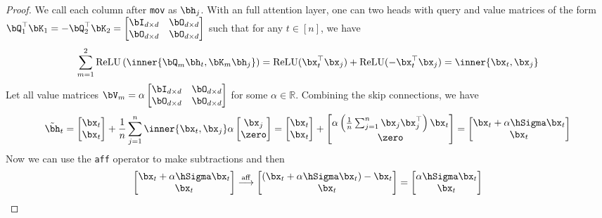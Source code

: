 \begin{proof}
We call each column after \verb|mov| as $\bh_j$. With an full attention layer, one can  two heads with query and value matrices of the form $\bQ_1^\top \bK_1 = -\bQ_2^\top \bK_2 = \begin{bmatrix}
    \bI_{d \times d} & \bO_{d \times d} \\
    \bO_{d \times d} & \bO_{d \times d}
\end{bmatrix}$ such that for any $t \in [n]$, we have 
\begin{equation}
    \sum_{m=1}^2 \mathrm{ReLU} \left(\inner{\bQ_m \bh_t, \bK_m \bh_j}\right) = \mathrm{ReLU}(\bx_t^\top \bx_j) +  \mathrm{ReLU}(-\bx_t^\top \bx_j) = \inner{\bx_t, \bx_j}
\end{equation}
Let all value matrices $\bV_m =\alpha \begin{bmatrix}
    \bI_{d \times d} & \bO_{d \times d} \\
    \bO_{d \times d} & \bO_{d \times d}
\end{bmatrix}$ for some $\alpha \in \mathbb R$. Combining the skip connections, we have 
\begin{equation}
    \tilde{\bh}_t = \begin{bmatrix}
        \bx_t \\ \bx_t
    \end{bmatrix} + \frac{1}{n} \sum_{j=1}^n \inner {\bx_t, \bx_j} \alpha \begin{bmatrix}
        \bx_j \\ \zero 
    \end{bmatrix}  = \begin{bmatrix}
        \bx_t \\ \bx_t
    \end{bmatrix} + \begin{bmatrix}
       \alpha \left(\frac{1}{n} \sum_{j=1}^n \bx_j \bx_j^\top \right) \bx_t \\ \zero
    \end{bmatrix} = \begin{bmatrix}
        \bx_t + \alpha \hSigma \bx_t \\ \bx_t
    \end{bmatrix} 
\end{equation}
Now we can use the \verb|aff| operator to make subtractions and then
\begin{equation}
    \begin{bmatrix}
        \bx_t + \alpha \hSigma \bx_t \\ \bx_t
    \end{bmatrix}  \overset{\mathrm{aff}}{\longrightarrow}\begin{bmatrix}
        (\bx_t + \alpha \hSigma \bx_t) - \bx_t  \\ \bx_t
    \end{bmatrix}  = \begin{bmatrix}
         \alpha \hSigma \bx_t \\ \bx_t
    \end{bmatrix}
\end{equation}


\end{proof}
